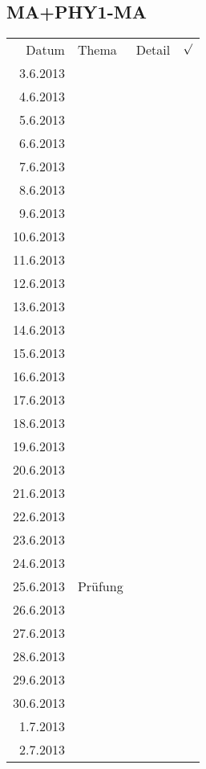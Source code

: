 \subsection{MA+PHY1-MA}
\begin{tabular}{r l p{} l}
\rowcolor{lgray} Datum     & Thema         & Detail & $\surd$ \\
\rowcolor{white}  3.6.2013 &               &  &  \\
\rowcolor{lgray}  4.6.2013 &               &  &  \\
\rowcolor{white}  5.6.2013 &               &  &  \\
\rowcolor{lgray}  6.6.2013 &               &  &  \\
\rowcolor{white}  7.6.2013 &               &  &  \\
\rowcolor{lgray}  8.6.2013 &               &  &  \\
\rowcolor{white}  9.6.2013 &               &  &  \\
\rowcolor{lgray} 10.6.2013 &               &  &  \\
\rowcolor{white} 11.6.2013 &               &  &  \\
\rowcolor{lgray} 12.6.2013 &               &  &  \\
\rowcolor{white} 13.6.2013 &               &  &  \\
\rowcolor{lgray} 14.6.2013 &               &  &  \\
\rowcolor{white} 15.6.2013 &               &  &  \\
\rowcolor{lgray} 16.6.2013 &               &  &  \\
\rowcolor{white} 17.6.2013 &               &  &  \\
\rowcolor{lgray} 18.6.2013 &               &  &  \\
\rowcolor{white} 19.6.2013 &               &  &  \\
\rowcolor{lgray} 20.6.2013 &               &  &  \\
\rowcolor{white} 21.6.2013 &               &  &  \\
\rowcolor{lgray} 22.6.2013 &               &  &  \\
\rowcolor{white} 23.6.2013 &               &  &  \\
\rowcolor{lgray} 24.6.2013 &               &  &  \\
\rowcolor{white} 25.6.2013 & Prüfung       &  &  \\
\rowcolor{lgray} 26.6.2013 &               &  &  \\
\rowcolor{white} 27.6.2013 &               &  &  \\
\rowcolor{lgray} 28.6.2013 &               &  &  \\
\rowcolor{white} 29.6.2013 &               &  &  \\
\rowcolor{lgray} 30.6.2013 &               &  &  \\
\rowcolor{white}  1.7.2013 &               &  &  \\
\rowcolor{lgray}  2.7.2013 &               &  &  \\
\end{tabular}


